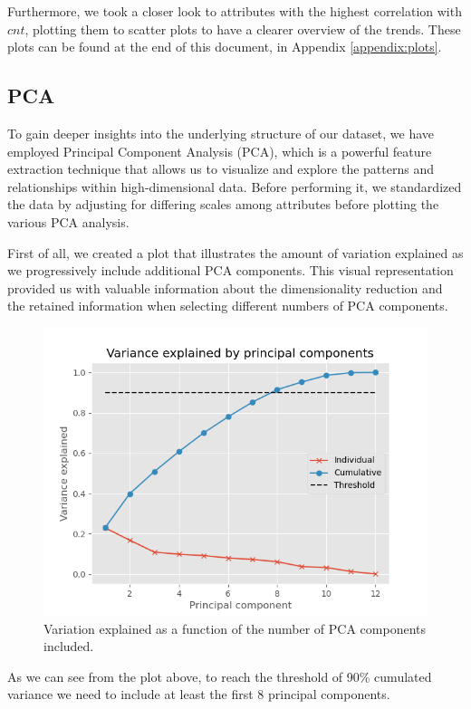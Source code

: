 \documentclass[11pt,a4paper]{article}
\begin{document}
Furthermore, we took a closer look to attributes with the highest correlation with $cnt$, plotting them to scatter plots to have a clearer overview of the trends. These plots can be found at the end of this document, in Appendix \ref{appendix:plots}.

\subsection{PCA}

To gain deeper insights into the underlying structure of our dataset, we have employed Principal Component Analysis (PCA), which is a powerful feature extraction technique that allows us to visualize and explore the patterns and relationships within high-dimensional data.
Before performing it, we standardized the data by adjusting for differing scales among attributes before plotting the various PCA analysis.

First of all, we created a plot that illustrates the amount of variation explained as we progressively include additional PCA components. This visual representation provided us with valuable information about the dimensionality reduction and the retained information when selecting different numbers of PCA components.

\begin{figure}[H]
    \centering
    \includegraphics[width=0.8\linewidth]{res/plots/variance_explained.png}
    \caption{Variation explained as a function of the number of PCA
components included.}
    \label{fig:/variance_explained}
\end{figure}

As we can see from the plot above, to reach the threshold of 90\% cumulated variance we need to include at least the first 8 principal components.
\end{document}

